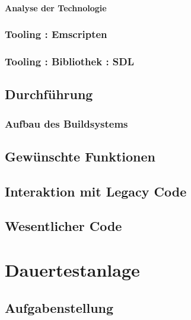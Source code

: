 \paragraph*{Analyse der Technologie}

\subsubsection{Tooling : Emscripten}
\subsubsection{Tooling : Bibliothek : SDL}
\subsection{Durchführung}
\subsubsection{Aufbau des Buildsystems}
\subsection{Gewünschte Funktionen}
\subsection{Interaktion mit Legacy Code}
\subsection{Wesentlicher Code}

\section{Dauertestanlage}
\subsection{Aufgabenstellung}
